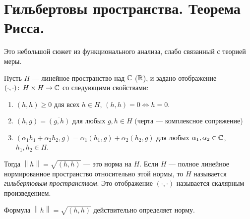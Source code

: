 
\section{Гильбертовы пространства. Теорема Рисса.}

Это небольшой сюжет из функционального анализа, слабо связанный с теорией меры.

\begin{df}
 Пусть $H$ --- линейное пространство над $\mathbb{C}$ ($\mathbb{R}$), и задано отображение $(\cdot, \cdot) \colon\, H \times H \to \mathbb{C} $ со следующими свойствами:
 \begin{enumerate}
  \item $(h, h) \geqslant 0$ для всех $h \in H$, $(h, h) = 0 \iff h = 0$.
  \item $(h, g) = \overline{(g,h)}$ для любых $g, h \in H$ (черта --- комплексное сопряжение)
  \item $(\alpha_1 h_1 + \alpha_2 h_2, g) = \alpha_1 (h_1, g) + \alpha_2 (h_2, g)$ для любых $\alpha_1, \alpha_2 \in \mathbb{C}$, $h_{1}, h_2 \in H$.
 \end{enumerate} Тогда $\left\| h \right\| = \sqrt{(h, h)}$ --- это норма на $H$. Если $H$ --- полное линейное нормированное пространство относительно этой нормы, то $H$ называется \textit{гильбертовым пространством}. Это отображение $(\cdot, \cdot)$ называется скалярным произведением.
\end{df}
\begin{remrk}
 Формула $\left\| h \right\| = \sqrt{(h,h)}$ действительно определяет норму.
\end{remrk}
